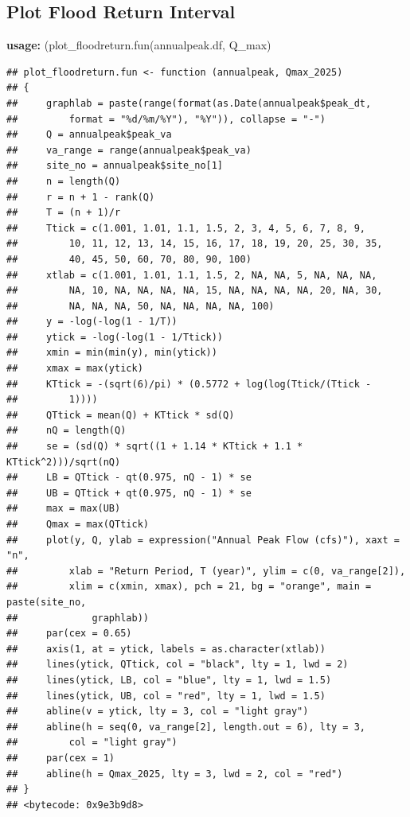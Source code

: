 \documentclass{tufte-handout}\usepackage[]{graphicx}\usepackage[]{xcolor}
\makeatletter
\newenvironment{kframe}{%
 \def\at@end@of@kframe{}%
 \ifinner\ifhmode%
  \def\at@end@of@kframe{\end{minipage}}%
  \begin{minipage}{\columnwidth}%
 \fi\fi%
 \def\FrameCommand##1{\hskip\@totalleftmargin \hskip-\fboxsep
 \colorbox{shadecolor}{##1}\hskip-\fboxsep
     \hskip-\linewidth \hskip-\@totalleftmargin \hskip\columnwidth}%
 \MakeFramed {\advance\hsize-\width
   \@totalleftmargin\z@ \linewidth\hsize
   \@setminipage}}%
 {\par\unskip\endMakeFramed%
 \at@end@of@kframe}
\newenvironment{knitrout}{}{} %
\makeatother
\begin{document}
\subsection{Plot Flood Return Interval }


\textbf{usage:} (plot\_floodreturn.fun(annualpeak.df, Q\_max)

\begin{knitrout}
\color{fgcolor}\begin{kframe}
\begin{verbatim}
## plot_floodreturn.fun <- function (annualpeak, Qmax_2025) 
## {
##     graphlab = paste(range(format(as.Date(annualpeak$peak_dt, 
##         format = "%d/%m/%Y"), "%Y")), collapse = "-")
##     Q = annualpeak$peak_va
##     va_range = range(annualpeak$peak_va)
##     site_no = annualpeak$site_no[1]
##     n = length(Q)
##     r = n + 1 - rank(Q)
##     T = (n + 1)/r
##     Ttick = c(1.001, 1.01, 1.1, 1.5, 2, 3, 4, 5, 6, 7, 8, 9, 
##         10, 11, 12, 13, 14, 15, 16, 17, 18, 19, 20, 25, 30, 35, 
##         40, 45, 50, 60, 70, 80, 90, 100)
##     xtlab = c(1.001, 1.01, 1.1, 1.5, 2, NA, NA, 5, NA, NA, NA, 
##         NA, 10, NA, NA, NA, NA, 15, NA, NA, NA, NA, 20, NA, 30, 
##         NA, NA, NA, 50, NA, NA, NA, NA, 100)
##     y = -log(-log(1 - 1/T))
##     ytick = -log(-log(1 - 1/Ttick))
##     xmin = min(min(y), min(ytick))
##     xmax = max(ytick)
##     KTtick = -(sqrt(6)/pi) * (0.5772 + log(log(Ttick/(Ttick - 
##         1))))
##     QTtick = mean(Q) + KTtick * sd(Q)
##     nQ = length(Q)
##     se = (sd(Q) * sqrt((1 + 1.14 * KTtick + 1.1 * KTtick^2)))/sqrt(nQ)
##     LB = QTtick - qt(0.975, nQ - 1) * se
##     UB = QTtick + qt(0.975, nQ - 1) * se
##     max = max(UB)
##     Qmax = max(QTtick)
##     plot(y, Q, ylab = expression("Annual Peak Flow (cfs)"), xaxt = "n", 
##         xlab = "Return Period, T (year)", ylim = c(0, va_range[2]), 
##         xlim = c(xmin, xmax), pch = 21, bg = "orange", main = paste(site_no, 
##             graphlab))
##     par(cex = 0.65)
##     axis(1, at = ytick, labels = as.character(xtlab))
##     lines(ytick, QTtick, col = "black", lty = 1, lwd = 2)
##     lines(ytick, LB, col = "blue", lty = 1, lwd = 1.5)
##     lines(ytick, UB, col = "red", lty = 1, lwd = 1.5)
##     abline(v = ytick, lty = 3, col = "light gray")
##     abline(h = seq(0, va_range[2], length.out = 6), lty = 3, 
##         col = "light gray")
##     par(cex = 1)
##     abline(h = Qmax_2025, lty = 3, lwd = 2, col = "red")
## }
## <bytecode: 0x9e3b9d8>
\end{verbatim}
\end{kframe}
\end{knitrout}
\end{document}
